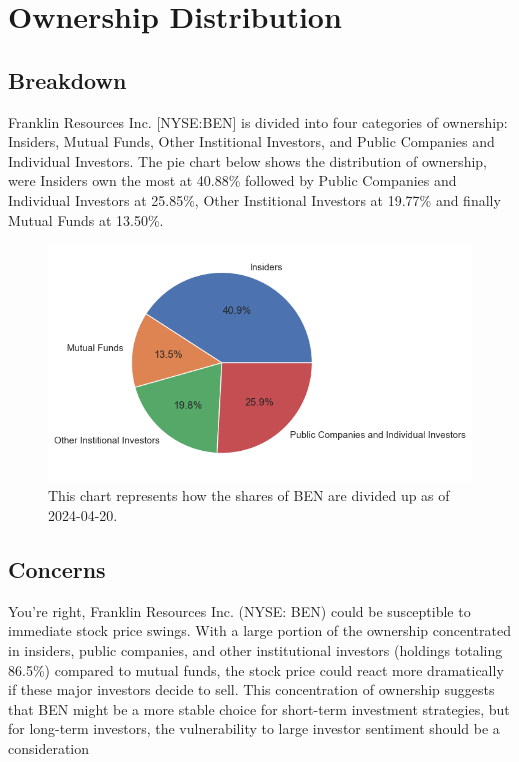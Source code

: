 \documentclass[9pt,a4paper,twoside]{tau}
\begin{document}
\section{Ownership Distribution}
    \subsection{Breakdown}
    Franklin Resources Inc. [NYSE:BEN] is divided into four categories of ownership: Insiders, Mutual Funds, Other Institional Investors, and Public Companies and Individual Investors. The pie chart below shows the distribution of ownership, were Insiders own the most at 40.88\% followed by Public Companies and Individual Investors at 25.85\%, Other Institional Investors at 19.77\% and finally Mutual Funds at 13.50\%.

    \begin{figure}[H]
        \centering
        \includegraphics[width=0.85\columnwidth]{images/OwnershipPieChart.png}
        \caption{This chart represents how the shares of BEN are divided up as of 2024-04-20.}
        \label{fig:figure}
    \end{figure}

    \subsection{Concerns}
    
    You're right, Franklin Resources Inc. (NYSE: BEN) could be susceptible to immediate stock price swings. With a large portion of the ownership concentrated in insiders, public companies, and other institutional investors (holdings totaling 86.5\%) compared to mutual funds, the stock price could react more dramatically if these major investors decide to sell.  This concentration of ownership suggests that BEN might be a more stable choice for short-term investment strategies, but for long-term investors, the vulnerability to large investor sentiment should be a consideration
\end{document}

